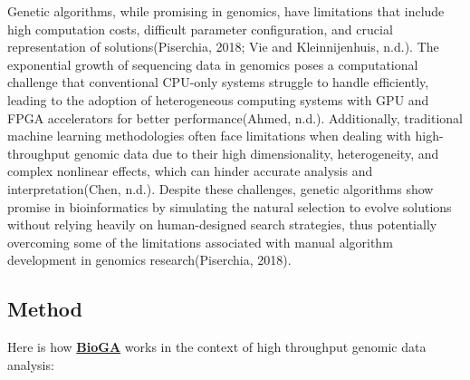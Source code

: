 \documentclass[
]{article}
\begin{document}
Genetic algorithms, while promising in genomics, have limitations that
include high computation costs, difficult parameter configuration, and
crucial representation of solutions(Piserchia, 2018; Vie and
Kleinnijenhuis, n.d.). The exponential growth of sequencing data in
genomics poses a computational challenge that conventional CPU-only
systems struggle to handle efficiently, leading to the adoption of
heterogeneous computing systems with GPU and FPGA accelerators for
better performance(Ahmed, n.d.). Additionally, traditional machine
learning methodologies often face limitations when dealing with
high-throughput genomic data due to their high dimensionality,
heterogeneity, and complex nonlinear effects, which can hinder accurate
analysis and interpretation(Chen, n.d.). Despite these challenges,
genetic algorithms show promise in bioinformatics by simulating the
natural selection to evolve solutions without relying heavily on
human-designed search strategies, thus potentially overcoming some of
the limitations associated with manual algorithm development in genomics
research(Piserchia, 2018).

\subsection{Method}\label{method}

Here is how
\href{https://doi.org/doi:10.18129/B9.bioc.BioGA}{\textbf{BioGA}} works
in the context of high throughput genomic data analysis:
\end{document}
